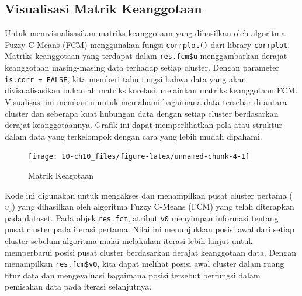 \documentclass[
  oneside]{book}
\newenvironment{Shaded}{\begin{snugshade}}{\end{snugshade}}
\newcommand{\AttributeTok}[1]{\textcolor[rgb]{0.13,0.29,0.53}{#1}}
\newcommand{\CommentTok}[1]{\textcolor[rgb]{0.56,0.35,0.01}{\textit{#1}}}
\newcommand{\ConstantTok}[1]{\textcolor[rgb]{0.56,0.35,0.01}{#1}}
\newcommand{\FunctionTok}[1]{\textcolor[rgb]{0.13,0.29,0.53}{\textbf{#1}}}
\newcommand{\NormalTok}[1]{#1}
\newcommand{\SpecialCharTok}[1]{\textcolor[rgb]{0.81,0.36,0.00}{\textbf{#1}}}
\begin{document}
\subsection*{Visualisasi Matrik Keanggotaan}\label{visualisasi-matrik-keanggotaan}

Untuk memvisualisasikan matriks keanggotaan yang dihasilkan oleh algoritma Fuzzy C-Means (FCM) menggunakan fungsi \texttt{corrplot()} dari library \texttt{corrplot}. Matriks keanggotaan yang terdapat dalam \texttt{res.fcm\$u} menggambarkan derajat keanggotaan masing-masing data terhadap setiap cluster. Dengan parameter \texttt{is.corr\ =\ FALSE}, kita memberi tahu fungsi bahwa data yang akan divisualisasikan bukanlah matriks korelasi, melainkan matriks keanggotaan FCM. Visualisasi ini membantu untuk memahami bagaimana data tersebar di antara cluster dan seberapa kuat hubungan data dengan setiap cluster berdasarkan derajat keanggotaannya. Grafik ini dapat memperlihatkan pola atau struktur dalam data yang terkelompok dengan cara yang lebih mudah dipahami.

\begin{Shaded}
\end{Shaded}

\begin{figure}[h]

{\centering \texttt{[image: 10-ch10\_files/figure-latex/unnamed-chunk-4-1]} 

}

\caption{Matrik Keagotaan}\label{fig:unnamed-chunk-4}
\end{figure}

Kode ini digunakan untuk mengakses dan menampilkan pusat cluster pertama (\(v_0\)) yang dihasilkan oleh algoritma Fuzzy C-Means (FCM) yang telah diterapkan pada dataset. Pada objek \texttt{res.fcm}, atribut \texttt{v0} menyimpan informasi tentang pusat cluster pada iterasi pertama. Nilai ini menunjukkan posisi awal dari setiap cluster sebelum algoritma mulai melakukan iterasi lebih lanjut untuk memperbarui posisi pusat cluster berdasarkan derajat keanggotaan data. Dengan menampilkan \texttt{res.fcm\$v0}, kita dapat melihat posisi awal cluster dalam ruang fitur data dan mengevaluasi bagaimana posisi tersebut berfungsi dalam pemisahan data pada iterasi selanjutnya.
\end{document}
